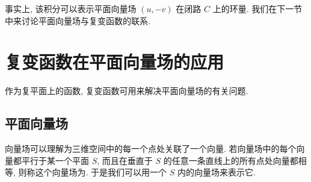 事实上, 该积分可以表示平面向量场 $(u,-v)$ 在闭路 $C$ 上的环量.
我们在下一节中来讨论平面向量场与复变函数的联系.



\section{复变函数在平面向量场的应用\optional}

作为复平面上的函数, 复变函数可用来解决平面向量场的有关问题.

\subsection{平面向量场}

向量场可以理解为三维空间中的每一个点处关联了一个向量.
若向量场中的每个向量都平行于某一个平面 $S$, 而且在垂直于 $S$ 的任意一条直线上的所有点处向量都相等, 则称这个向量场为.
于是我们可以用一个 $S$ 内的向量场来表示它.

